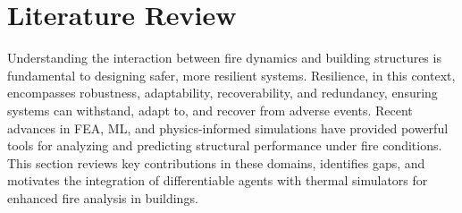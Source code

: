 \section{Literature Review}
\label{sec:literature}
Understanding the interaction between fire dynamics and building structures is fundamental to designing safer, more resilient systems. Resilience, in this context, encompasses robustness, adaptability, recoverability, and redundancy, ensuring systems can withstand, adapt to, and recover from adverse events. Recent advances in FEA, ML, and physics-informed simulations have provided powerful tools for analyzing and predicting structural performance under fire conditions. This section reviews key contributions in these domains, identifies gaps, and motivates the integration of differentiable agents with thermal simulators for enhanced fire analysis in buildings.

